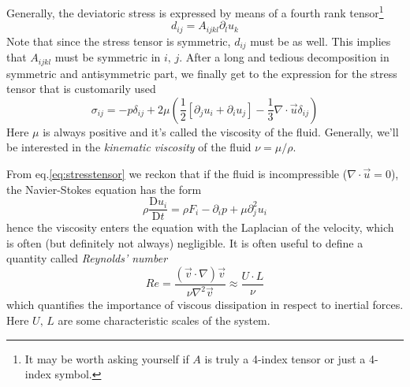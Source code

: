 \par Generally, the deviatoric stress is expressed by means of a fourth rank tensor\footnote{It may be worth asking yourself if $A$ is truly a 4-index tensor or just a 4-index symbol.}
\begin{equation*}
    d_{ij} = A_{ijkl}\partial_{l}u_{k}
\end{equation*}
Note that since the stress tensor is symmetric, $d_{ij}$ must be as well. This implies that $A_{ijkl}$ must be symmetric in $i,\,j$. After a long and tedious decomposition in symmetric and antisymmetric part, we finally get to the expression for the stress tensor that is customarily used 
\begin{equation}
    \sigma_{ij} = -p\delta_{ij}+2\mu\left(\frac{1}{2}\left[\partial_{j}u_{i}+\partial_{i}u_{j}\right]-\frac{1}{3}\nabla\cdot\vec{u}\delta_{ij}\right)
    \label{eq:stresstensor}
\end{equation}
Here $\mu$ is always positive and it's called the viscosity of the fluid. Generally, we'll be interested in the \emph{kinematic viscosity} of the fluid $\nu =\mu/\rho$.
\par From eq.\ref{eq:stresstensor} we reckon that if the fluid is incompressible ($\nabla\cdot\vec{u} = 0$), the Navier-Stokes equation has the form 
\begin{equation}
    \rho\frac{\text{D}u_{i}}{\text{D}t} = \rho F_{i} -\partial_{i}p +\mu\partial_{j}^{2}u_{i}
    \label{eq:incompressible_ns}
\end{equation}
hence the viscosity enters the equation with the Laplacian of the velocity, which is often (but definitely not always) negligible. It is often useful to define a quantity called \emph{Reynolds' number}
\begin{equation}
    Re = \frac{(\vec{v}\cdot\nabla)\vec{v}}{\nu\nabla^{2}\vec{v}} \approx \frac{U\cdot L}{\nu}
    \label{eq:reynoldsnumber}
\end{equation}
which quantifies the importance of viscous dissipation in respect to inertial forces. Here $U,\,L$ are some characteristic scales of the system.
